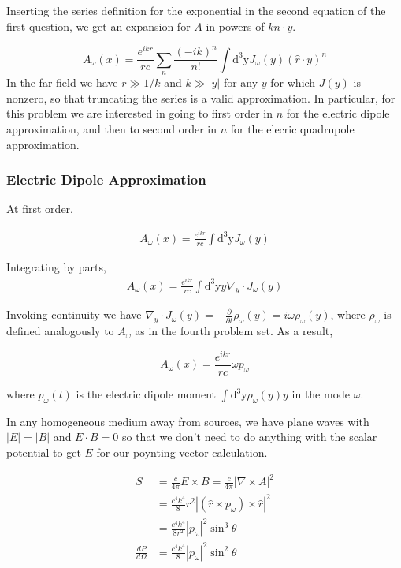 \documentclass[12pt]{article}
\begin{document}
Inserting the series definition for the exponential in the second equation of the first question, we get an expansion for \(A\) in powers of \(kn\cdot y\). 

\[A_\omega(x) = \frac{e^{ik r}}{rc}\sum_n \frac{(-ik)^n}{n!}\int \mathrm{d^3y} J_\omega (y)(\hat{r} \cdot y)^n
\]
In the far field we have \(r \gg 1/k\) and \(k \gg |y|\) for any \(y\) for which \(J(y)\) is nonzero, so that truncating the series is a valid approximation. In particular, for this problem we are interested in going to first order in \(n\) for the electric dipole approximation, and then to second order in \(n\) for the elecric quadrupole approximation.

\subsubsection*{Electric Dipole Approximation}

At first order,

\begin{align*}
A_\omega(x) = \frac{e^{ik r}}{rc}\int \mathrm{d^3y} J_\omega (y)
\end{align*}

Integrating by parts,
\begin{align*}
A_\omega(x) = \frac{e^{ik r}}{rc}\int \mathrm{d^3y} y \nabla_y \cdot J_\omega (y)
\end{align*}

Invoking continuity we have \(\nabla_y \cdot J_\omega (y) = -\frac{\partial}{\partial t} \rho_\omega (y) = i\omega \rho_\omega(y) \), where \(\rho_\omega\) is defined analogously to \(A_\omega\) as in the fourth problem set. As a result,

\[A_\omega(x) = \frac{e^{ik r}}{rc}\omega p_\omega
\]

where \(p_\omega(t)\) is the electric dipole moment \( \int \mathrm{d^3y} \rho_\omega(y)y \) in the mode \(\omega\).

In any homogeneous medium away from sources, we have plane waves with \(|E| = |B| \) and \(E \cdot B = 0\) so that we don't need to do anything with the scalar potential to get \(E\) for our poynting vector calculation.

\begin{align*}
S &= \frac{c}{4\pi}E \times B = \frac{c}{4\pi}|\nabla \times A|^2 \\
&= \frac{c^4 k^4}{8}r^2| (\hat{r} \times p_\omega) \times \hat{r}|^2 \\
&= \frac{c^4 k^4}{8r^2}|p_\omega|^2\sin^3\theta \\
\frac{dP}{d\Omega} &= \frac{c^4 k^4}{8}|p_\omega|^2\sin^2\theta 
\end{align*}
\end{document}
